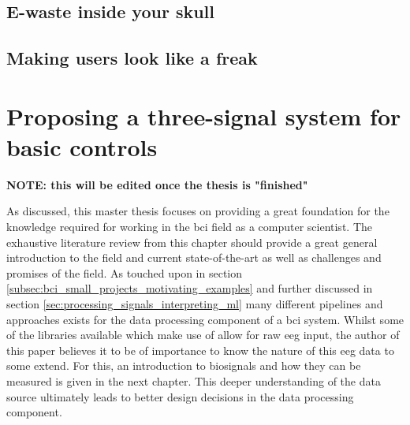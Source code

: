 \subsection{E-waste inside your skull}
\label{subsec:bci_ethical_e_waste}


\lipsum[1-4]


\subsection{Making users look like a freak}
\label{subsec:bci_ethical_freaky}

\lipsum[1-2]


\section{Proposing a three-signal system for basic controls}
\label{sec:bci_small_projects_ours}


\textbf{NOTE: this will be edited once the thesis is "finished"}

As discussed, this master thesis focuses on providing a great foundation for the knowledge required for working in the \gls{bci} field as a computer scientist.
The exhaustive literature review from this chapter should provide a great general introduction to the field and current state-of-the-art as well as challenges and promises of the field.
As touched upon in section \ref{subsec:bci_small_projects_motivating_examples} and further discussed in section \ref{sec:processing_signals_interpreting_ml} many different pipelines and approaches exists for the data processing component of a \gls{bci} system.
Whilst some of the libraries available which make use of  allow for raw \gls{eeg} input, the author of this paper believes it to be of importance to know the nature of this \gls{eeg} data to some extend.
For this, an introduction to \glspl{biosignal} and how they can be measured is given in the next chapter.
This deeper understanding of the data source ultimately leads to better design decisions in the data processing component.

